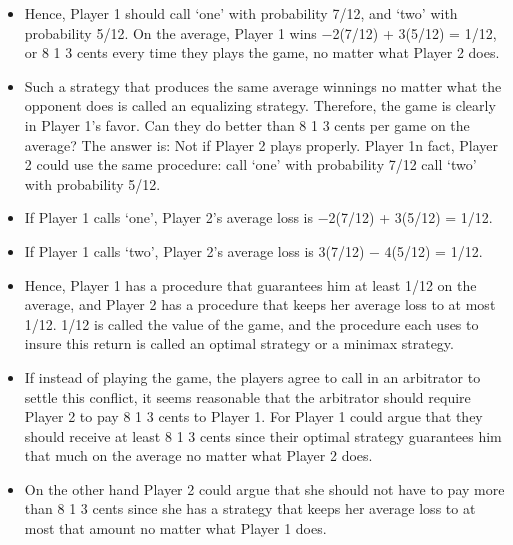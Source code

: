 \documentclass[]{report}
\begin{document}
\begin{itemize}
\item Hence, Player 1 should call ‘one’ with probability 7/12, and ‘two’ with probability 5/12. On the
average, Player 1 wins −2(7/12) + 3(5/12) = 1/12, or 8 1
3 cents every time they plays the game, no
matter what Player 2 does. 
\item Such a strategy that produces the same average winnings no matter
what the opponent does is called an equalizing strategy.
Therefore, the game is clearly in Player 1’s favor. Can they do better than 8 1
3 cents per game
on the average? The answer is: Not if Player 2 plays properly. Player 1n fact, Player 2 could use the same
procedure:
call ‘one’ with probability 7/12
call ‘two’ with probability 5/12.
\item If Player 1 calls ‘one’, Player 2’s average loss is −2(7/12) + 3(5/12) = 1/12. 
\item If Player 1 calls ‘two’, Player 2’s average
loss is 3(7/12) − 4(5/12) = 1/12.
\item Hence, Player 1 has a procedure that guarantees him at least 1/12 on the average, and Player 2 has
a procedure that keeps her average loss to at most 1/12. 1/12 is called the value of the
game, and the procedure each uses to insure this return is called an optimal strategy or
a minimax strategy.
\item If instead of playing the game, the players agree to call in an arbitrator to settle this
conflict, it seems reasonable that the arbitrator should require Player 2 to pay 8 1
3 cents to Player 1. For
Player 1 could argue that they should receive at least 8 1
3 cents since their optimal strategy guarantees
him that much on the average no matter what Player 2 does. 
\item On the other hand Player 2 could argue
that she should not have to pay more than 8 1
3 cents since she has a strategy that keeps
her average loss to at most that amount no matter what Player 1 does.
\end{itemize}
\end{document}
